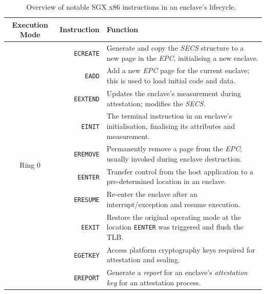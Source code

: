 \begin{table}
    \centering
    \newcommand\tableTop{\rule{0pt}{3ex}}
    \newcommand\tableMid{\rule{0pt}{3ex}}
    \newcommand\tableBottom{\rule[-2ex]{0pt}{0pt}}
    \begin{tabular}{|c|r|p{8.5cm}|} 
        \hline
        Execution Mode & Instruction & Function \\ [0.1ex] 
        \hline\hline
        \multirow{11}{*}{Ring 0} 
            & \tableTop{\texttt{ECREATE}} & \tableTop{Generate and copy the \textit{SECS} structure to a new page in the \textit{EPC}, initialising a new enclave.} \\ 
            & \texttt{EADD} & \tableMid{Add a new \textit{EPC} page for the current enclave; this is used to load initial code and data.} \\ 
            & \texttt{EEXTEND} & \tableMid{Updates the enclave's measurement during attestation; modifies the \textit{SECS}.} \\ 
            & \texttt{EINIT} & \tableMid{The terminal instruction in an enclave's initialisation, finalising its attributes and measurement.} \\ 
            & \texttt{EREMOVE} & \tableMid{Permanently remove a page from the \textit{EPC}; usually invoked during enclave destruction.} \tableBottom \\ 
        \hline\hline
        \multirow{11}{*}{Ring 3} 
        & \tableTop{\texttt{EENTER}} & \tableTop{Transfer control from the host application to a pre-determined location in an enclave.} \\ 
        & \texttt{ERESUME} & \tableMid{Re-enter the enclave after an interrupt/exception and resume execution.} \\ 
        & \texttt{EEXIT} & \tableMid{Restore the original operating mode at the location \texttt{EENTER} was triggered and flush the TLB.} \\ 
        & \texttt{EGETKEY} & \tableMid{Access platform cryptography keys required for attestation and sealing.} \\ 
        & \texttt{EREPORT} & \tableMid{Generate a \textit{report} for an enclave's \textit{attestation key} for an attestation process.} \tableBottom \\ 
        \hline
    \end{tabular}
    \vspace{5mm}
    \caption[Overview of notable SGX x86 instructions in an enclave's lifecycle.]{Overview of notable SGX x86 instructions in an enclave's lifecycle.~\cite{sgx-prog-reference}}
    \label{table:sgx-instructions}
\end{table}


